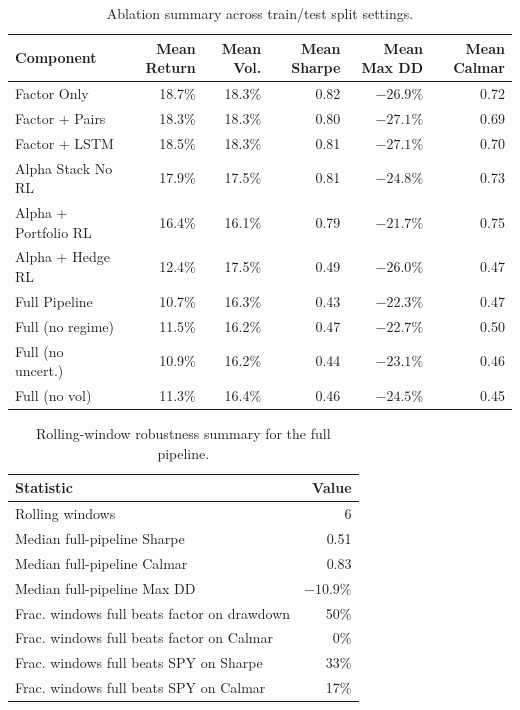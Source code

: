 \begin{table}[H]
\centering
\caption{Ablation summary across train/test split settings.}
\label{tab:ablation_summary}
\begin{tabular}{@{} l r r r r r @{}}
\toprule
Component & Mean Return & Mean Vol. & Mean Sharpe & Mean Max DD & Mean Calmar \\
\midrule
Factor Only & 18.7\% & 18.3\% & 0.82 & $-26.9\%$ & 0.72 \\
Factor + Pairs & 18.3\% & 18.3\% & 0.80 & $-27.1\%$ & 0.69 \\
Factor + LSTM & 18.5\% & 18.3\% & 0.81 & $-27.1\%$ & 0.70 \\
Alpha Stack No RL & 17.9\% & 17.5\% & 0.81 & $-24.8\%$ & 0.73 \\
Alpha + Portfolio RL & 16.4\% & 16.1\% & 0.79 & $-21.7\%$ & 0.75 \\
Alpha + Hedge RL & 12.4\% & 17.5\% & 0.49 & $-26.0\%$ & 0.47 \\
Full Pipeline & 10.7\% & 16.3\% & 0.43 & $-22.3\%$ & 0.47 \\
Full (no regime) & 11.5\% & 16.2\% & 0.47 & $-22.7\%$ & 0.50 \\
Full (no uncert.) & 10.9\% & 16.2\% & 0.44 & $-23.1\%$ & 0.46 \\
Full (no vol) & 11.3\% & 16.4\% & 0.46 & $-24.5\%$ & 0.45 \\
\bottomrule
\end{tabular}
\end{table}

\begin{table}[H]
\centering
\caption{Rolling-window robustness summary for the full pipeline.}
\label{tab:robustness_summary}
\begin{tabular}{@{} l r @{}}
\toprule
Statistic & Value \\
\midrule
Rolling windows & 6 \\
Median full-pipeline Sharpe & 0.51 \\
Median full-pipeline Calmar & 0.83 \\
Median full-pipeline Max DD & $-10.9\%$ \\
Frac. windows full beats factor on drawdown & 50\% \\
Frac. windows full beats factor on Calmar & 0\% \\
Frac. windows full beats SPY on Sharpe & 33\% \\
Frac. windows full beats SPY on Calmar & 17\% \\
\bottomrule
\end{tabular}
\end{table}

